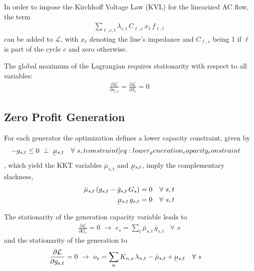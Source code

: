 \documentclass[11pt,twocolumn]{article}
\newcommand{\ubar}[1]{\underaccent{\bar}{#1}}
\newcommand{\resultsin}[1]{\hspace{6pt} \bot  \hspace{6pt} #1}
\newcommand{\Forall}[1]{\hspace{10pt} \forall \,\, #1 }
\newcommand{\pdv}[2]{\frac{\partial #1}{\partial #2}}
\newcommand{\state}[1][i]{s_{#1,t}}
\newcommand{\capacity}{S_{i}}
\newcommand{\generation}{g_{s,t}}
\newcommand{\generationpotential}{\bar{g}_{s,t}}
\newcommand{\capacitygeneration}{G_{s}}
\newcommand{\operationalpricegeneration}{o_{s}}
\newcommand{\capitalpricegeneration}{c_{s}}
\newcommand{\mulowergeneration}{\ubar{\mu}_{s,t}}
\newcommand{\muuppergeneration}{\bar{\mu}_{s,t}}
\newcommand{\flow}{f_{\ell,t}}
\newcommand{\lagrangian}{\mathcal{L}}
\newcommand{\lmp}[1][n]{\lambda_{#1,t}}
\newcommand{\incidencegenerator}[1][n]{K_{#1,s}}
\newcommand{\cycle}{C_{\ell,c}}
\newcommand{\reactance}{x_\ell}
\newcommand{\cycleprice}{\lambda_{c,t}}
\begin{document}
In order to impose the Kirchhoff Voltage Law (KVL) for the linearized AC flow, the term 
\begin{align}
    \sum_{\ell,c,t} \cycleprice \, \cycle \, \reactance \, \flow 
\end{align}
can be added to $\lagrangian$, with $\reactance$ denoting the line's impedance and $\cycle$ being 1 if $\ell$ is part of the cycle $c$ and zero otherwise.

The global maximum of the Lagrangian requires stationarity with respect to all variables:
\begin{align}
    \pdv{\lagrangian}{\state} = \pdv{\lagrangian}{\capacity} = 0    
\end{align} 



\subsection{Zero Profit Generation}
\label{sec:zero_profit_generation}
For each generator the optimization defines a lower capacity constraint, given by 
\begin{align}
    - \generation &\le 0 \resultsin{\mulowergeneration} \Forall{s,t} 
    \label[constraint]{eq:lower_generation_capacity_constraint}
\end{align} 
, which yield the KKT variables $\muuppergeneration$ and $\mulowergeneration$, imply the complementary slackness,
\begin{align}
\muuppergeneration \left( \generation - \generationpotential \, \capacitygeneration \right)  &= 0  \Forall{s,t} 
\label{eq:complementary_slackness_upper_generation} \\
\mulowergeneration  \, \generation &= 0 \Forall{s,t}
\label{eq:complementary_slackness_lower_generation} 
\end{align}


The stationarity of the generation capacity variable leads to 
\begin{align}
\pdv{\lagrangian}{\capacitygeneration}  = 0 \,\, \rightarrow \,\, 
\capitalpricegeneration =  \sum_t \muuppergeneration \, \generationpotential  \Forall{s}
\label{eq:capex_generation_duality}
\end{align}
and the stationarity of the generation to 
\begin{align}
\pdv{\lagrangian}{\generation} &= 0 \,\, \rightarrow \,\,  
\operationalpricegeneration =  \sum_n \incidencegenerator \, \lmp - \muuppergeneration + \mulowergeneration \Forall{s} \label{eq:opex_duality}
\end{align}
\end{document}
